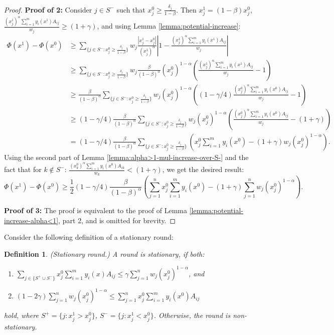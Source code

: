 \documentclass[11pt]{article}
\newtheorem{definition}[theorem]{Definition}
\begin{document}
\begin{proof}
\noindent\textbf{Proof of 2:} Consider $j\in S^-$ such that $x_j^0 \geq \frac{\delta_j}{1-\beta}$. Then $x_j^1 = (1-\beta)x_j^0$, $\frac{(x_j^1)^{\alpha}\sum_{i=1}^m y_i(x^1)A_{ij}}{w_j}\geq (1+\gamma)$, and using Lemma \ref{lemma:potential-increase}:
\begin{align*}
\Phi(x^1) - \Phi(x^0) &\geq \sum_{\{j\in S^-: x_j^0 \geq \frac{\delta_j}{1-\beta}\}} w_j \frac{|x_j^1 - x_j^0|}{(x_j^1)^{\alpha}}\left|1 - \frac{(x_j^1)^{\alpha}\sum_{i=1}^m y_i(x^1)A_{ij}}{w_j}\right|\\
&\geq \sum_{\{j\in S^-: x_j^0 \geq \frac{\delta_j}{1-\beta}\}} w_j \frac{\beta}{(1-\beta)^{\alpha}}(x_j^0)^{1-\alpha} \left(\frac{(x_j^1)^{\alpha}\sum_{i=1}^m y_i(x^1)A_{ij}}{w_j} - 1 \right)\\
&\geq \frac{\beta}{(1-\beta)^{\alpha}}\sum_{\{j\in S^-: x_j^0 \geq \frac{\delta_j}{1-\beta}\}}w_j(x_j^0)^{1-\alpha}\left((1-\gamma/4)\frac{(x_j^0)^{\alpha}\sum_{i=1}^m y_i(x^0)A_{ij}}{w_j} - 1 \right)\\
&\geq(1-\gamma/4) \frac{\beta}{(1-\beta)^{\alpha}} \sum_{\{j\in S^-: x_j^0 \geq \frac{\delta_j}{1-\beta}\}}w_j(x_j^0)^{1-\alpha}\left(\frac{(x_j^0)^{\alpha}\sum_{i=1}^m y_i(x^0)A_{ij}}{w_j} - (1+\gamma) \right)\\
&=(1-\gamma/4) \frac{\beta}{(1-\beta)^{\alpha}} \sum_{\{j\in S^-: x_j^0 \geq \frac{\delta_j}{1-\beta}\}}\left( x_j^0 \sum_{i=1}^m y_i(x^0) - (1+\gamma) w_j (x_j^0)^{1-\alpha}\right).
\end{align*}
Using the second part of Lemma \ref{lemma:alpha>1-mul-increase-over-S-} and the fact that for $k\notin S^-$: $\frac{(x_k^0)^{\alpha}\sum_{i=1}^m y_i(x^0)A_{ik}}{w_k}<(1+\gamma)$, we get the desired result:
\begin{equation*}
\Phi(x^1) - \Phi(x^0) \geq \frac{1}{2}(1-\gamma/4) \frac{\beta}{(1-\beta)^{\alpha}}\left(\sum_{j=1}^n x_j^0 \sum_{i=1}^m y_i(x^0) - (1+\gamma) \sum_{j=1}^nw_j (x_j^0)^{1-\alpha}\right).
\end{equation*}

\noindent\textbf{Proof of 3:} The proof is equivalent to the proof of Lemma \ref{lemma:potential-increase-alpha<1}, part 2, and is omitted for brevity. 
\end{proof}

Consider the following definition of a stationary round:
\begin{definition}\label{def:stationary-round}
(Stationary round.) A round is stationary, if both:
\begin{enumerate}[topsep = 5pt]
\item $\sum_{j\in\{S^+\cup S^-\}} x_j^0\sum_{i=1}^m y_i(x)A_{ij} \leq \gamma \sum_{j=1}^n w_j {(x_j^0)}^{1-\alpha}$, and
\item $(1-2\gamma)\sum_{j=1}^n w_j {(x_j^0)}^{1-\alpha}\leq \sum_{j=1}^n x_j^0\sum_{i=1}^m y_i(x^0)A_{ij}$
\end{enumerate}
hold, where $S^+ = \{j: x_j^1 > x_j^0\}$, $S^- = \{j: x_j^1 < x_j^0\}$. Otherwise, the round is non-stationary.
\end{definition}
\end{document}
